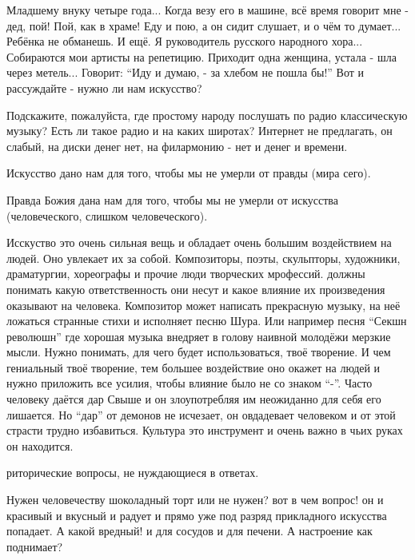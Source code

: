\begin{itemize}

Младшему внуку четыре года... Когда везу его в машине, всё время говорит мне -
дед, пой! Пой, как в храме! Еду и пою, а он сидит слушает, и о чём то думает...
Ребёнка не обманешь. И ещё. Я руководитель русского народного хора...
Собираются мои артисты на репетицию. Приходит одна женщина, устала - шла через
метель... Говорит: \enquote{Иду и думаю, - за хлебом не пошла бы!} Вот и рассуждайте -
нужно ли нам искусство?


Подскажите, пожалуйста, где простому народу послушать по радио классическую
музыку? Есть ли такое радио и на каких широтах? Интернет не предлагать, он
слабый, на диски денег нет, на филармонию - нет и денег и времени.


Искусство дано нам для того, чтобы мы не умерли от правды (мира сего).

Правда Божия дана нам для того, чтобы мы не умерли от искусства (человеческого,
слишком человеческого).


Исскуство это очень сильная вещь и обладает очень большим воздействием на
людей. Оно увлекает их за собой. Композиторы, поэты, скульпторы, художники,
драматургии, хореографы и прочие люди творческих мрофессий. должны понимать
какую ответственность они несут и какое влияние их произведения оказывают на
человека. Композитор может написать прекрасную музыку, на неё ложаться странные
стихи и исполняет песню Шура. Или например песня \enquote{Секшн революшн} где хорошая
музыка внедряет в голову наивной молодёжи мерзкие мысли. Нужно понимать, для
чего будет использоваться, твоё творение. И чем гениальный твоё творение, тем
большее воздействие оно окажет на людей и нужно приложить все усилия, чтобы
влияние было не со знаком \enquote{-}. Часто человеку даётся дар Свыше и он
злоупотребляя им неожиданно для себя его лишается. Но \enquote{дар} от демонов не
исчезает, он овдадевает человеком и от этой страсти трудно избавиться. Культура
это инструмент и очень важно в чьих руках он находится.


риторические вопросы, не нуждающиеся в ответах.

Нужен человечеству шоколадный торт или не нужен? вот в чем вопрос! он и
красивый и вкусный и радует и прямо уже под разряд прикладного искусства
попадает. А какой вредный! и для сосудов и для печени. А настроение как
поднимает?


\end{itemize}
